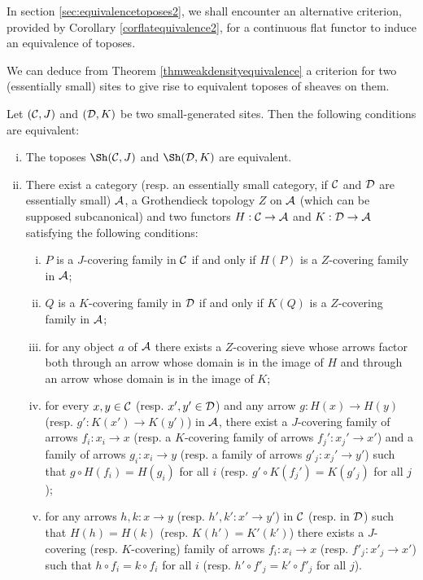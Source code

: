 \documentclass[a4paper,12pt]{article}
\begin{document}
\begin{remark}
	In section \ref{sec:equivalencetoposes2}, we shall encounter an alternative criterion, provided by Corollary \ref{corflatequivalence2}, for a continuous flat functor to induce an equivalence of toposes. 
\end{remark}

We can deduce from Theorem \ref{thmweakdensityequivalence} a criterion for two (essentially small) sites to give rise to equivalent toposes of sheaves on them.

\begin{theorem}
	Let $({\cal C}, J)$ and $({\cal D}, K)$ be two small-generated sites. Then the following conditions are equivalent:
	
	\begin{enumerate}[(i)]
		\item The toposes $\Sh({\cal C}, J)$ and $\Sh({\cal D}, K)$ are equivalent.
		
		\item There exist a category (resp. an essentially small category, if $\cal C$ and $\cal D$ are essentially small) $\cal A$, a Grothendieck topology $Z$ on $\cal A$ (which can be supposed subcanonical) and two functors $H:{\cal C}\to {\cal A}$ and $K:{\cal D}\to {\cal A}$ satisfying the following conditions:
		\begin{enumerate}[(i)]	
		\item $P$ is a $J$-covering family in $\cal C$ if and only if $H(P)$ is a $Z$-covering family in $\cal A$;
		\item $Q$ is a $K$-covering family in $\cal D$ if and only if $K(Q)$ is a $Z$-covering family in $\cal A$;
		\item for any object $a$ of $\cal A$ there exists a $Z$-covering sieve whose arrows factor both through an arrow whose domain is in the image of $H$ and through an arrow whose domain is in the image of $K$;
		\item for every $x, y\in {\cal C}$ (resp. $x',y'\in {\cal D}$) and any arrow $g:H(x)\to H(y)$ (resp. $g':K(x')\to K(y')$) in $\cal A$, there exist a $J$-covering family of arrows $f_{i}:x_{i}\to x$ (resp. a $K$-covering family of arrows $f_{j}':x_{j}'\to x'$) and a family of arrows $g_{i}:x_{i}\to y$ (resp. a family of arrows $g'_{j}:x_{j}'\to y'$) such that $g\circ H(f_{i})=H(g_{i})$ for all $i$ (resp. $g'\circ K(f_{j}')=K(g'_{j})$ for all $j$);
		\item for any arrows $h, k:x\to y$ (resp. $h',k':x'\to y'$) in $\cal C$ (resp. in $\cal D$) such that $H(h)=H(k)$ (resp. $K(h')=K'(k')$) there exists a $J$-covering (resp. $K$-covering) family of arrows $f_{i}:x_{i}\to x$ (resp. $f'_{j}:x'_{j}\to x'$) such that $h\circ f_{i}=k\circ f_{i}$ for all $i$ (resp. $h'\circ f'_{j}=k'\circ f'_{j}$ for all $j$). 
		\end{enumerate}		 

	\end{enumerate} 

\end{theorem}
\end{document}
